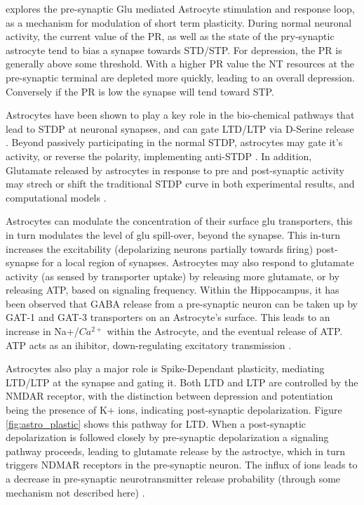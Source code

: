     
    \cite{pitta_2012} explores the pre-synaptic Glu mediated Astrocyte
    stimulation and response loop, as a mechanism for modulation of short term
    plasticity. During normal neuronal activity, the current value of the PR, as
    well as the state of the pry-synaptic astrocyte tend to bias a synapse
    towards STD/STP. For depression, the PR is generally above some
    threshold. With a higher PR value the NT resources at the pre-synaptic
    terminal are depleted more quickly, leading to an overall
    depression. Conversely if the PR is low the synapse will tend toward
    STP.

    Astrocytes have been shown to play a key role in the bio-chemical pathways
    that lead to STDP at neuronal synapses, and can gate LTD/LTP via D-Serine
    release \cite{manninen_2019}. Beyond passively participating in the normal
    STDP, astrocytes may gate it's activity, or reverse the polarity,
    implementing anti-STDP \cite{min_2012}. In addition, Glutamate released by
    astrocytes in response to pre and post-synaptic activity may strech or shift
    the traditional STDP curve in both experimental results, and computational
    models \cite{pitta_2016}.

    Astrocytes can modulate the concentration of their surface glu transporters,
    this in turn modulates the level of glu spill-over, beyond the synapse. This
    in-turn increases the excitability (depolarizing neurons partially towards
    firing) post-synapse for a local region of synapses. Astrocytes may also
    respond to glutamate activity (as sensed by transporter uptake) by releasing
    more glutamate, or by releasing ATP, based on signaling frequency. Within
    the Hippocampus, it has been observed that GABA release from a pre-synaptic
    neuron can be taken up by GAT-1 and GAT-3 transporters on an Astrocyte's
    surface. This leads to an increase in Na+/$Ca^{2+}$ within the Astrocyte,
    and the eventual release of ATP. ATP acts as an ihibitor, down-regulating
    excitatory transmission \cite{mederos_2018}.
    
    Astrocytes also play a major role is Spike-Dependant plasticity, mediating
    LTD/LTP at the synapse and gating it. Both LTD and LTP are controlled by the
    NMDAR receptor, with the distinction between depression and potentiation
    being the presence of K+ ions, indicating post-synaptic
    depolarization. Figure \ref{fig:astro_plastic} shows this pathway for
    LTD. When a post-synaptic depolarization is followed closely by pre-synaptic
    depolarization a signaling pathway proceeds, leading to glutamate release by
    the astroctye, which in turn triggers NDMAR receptors in the pre-synaptic
    neuron. The influx of ions leads to a decrease in pre-synaptic
    neurotransmitter release probability (through some mechanism not described
    here) \cite{min_2012}.
        

